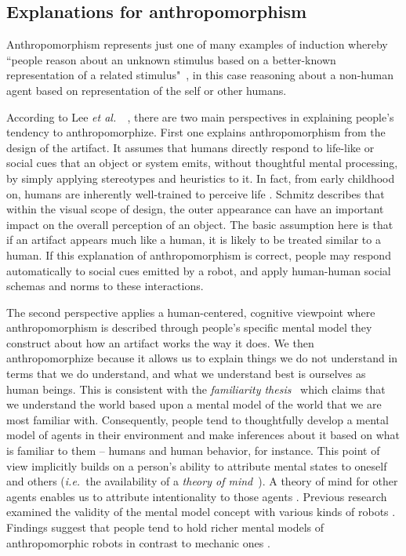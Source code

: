 \documentclass{sig-alternate-2013}
\newcommand{\etal}{{\textit{et al.~}}}
\newcommand{\ie}{{\textit{i.e.~}}}
\begin{document}
\subsection*{Explanations for anthropomorphism}

Anthropomorphism represents just one of many examples of induction whereby
``people reason about an unknown stimulus based on a better-known representation
of a related stimulus"~\cite{epley_when_2008}, in this case reasoning about a
non-human agent based on representation of the self or other humans.

According to Lee \etal~\cite{lee_human_2005}, there are two main perspectives in
explaining people's tendency to anthropomorphize. First one explains
anthropomorphism from the design of the artifact. It assumes that humans
directly respond to life-like or social cues that an object or system emits,
without thoughtful mental processing, by simply applying stereotypes and
heuristics to it. In fact, from early childhood on, humans are inherently
well-trained to perceive life \cite{epley_seeing_2007}. Schmitz
\cite{schmitz_concepts_2011} describes that within the visual scope of design,
the outer appearance can have an important impact on the overall perception of
an object. The basic assumption here is that if an artifact appears much like a
human, it is likely to be treated similar to a human. If this explanation of
anthropomorphism is correct, people may respond automatically to social cues
emitted by a robot, and apply human-human social schemas and norms to these
interactions.

The second perspective applies a human-centered, cognitive viewpoint where
anthropomorphism is described through people's specific mental model they
construct about how an artifact works the way it does.  We then anthropomorphize
because it allows us to explain things we do not understand in terms that we do
understand, and what we understand best is ourselves as human beings. This is
consistent with the \emph{familiarity thesis}~\cite{hegel_understanding_2008}
which claims that we understand the world based upon a mental model of the world
that we are most familiar with. Consequently, people tend to thoughtfully
develop a mental model of agents in their environment and make inferences about
it based on what is familiar to them -- humans and human behavior, for instance. This point of view implicitly builds on a
person's ability to attribute mental states to oneself and others (\ie the
availability of a \emph{theory of mind}~\cite{premack1978does}). A theory of
mind for other agents enables us to attribute intentionality to those agents
\cite{leslie_pretense_1987,admoni_multi-category_2012}. Previous research
examined the validity of the mental model concept with various kinds of robots
\cite{schmitz_concepts_2011,kiesler_mental_2002}. Findings suggest that people
tend to hold richer mental models of anthropomorphic robots in contrast to
mechanic ones \cite{kiesler_mental_2002}.
\end{document}

